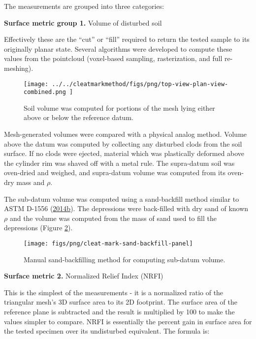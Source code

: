 \documentclass[
  letterpaper,
  openany]{book}
\begin{document}
The measurements are grouped into three categories:

\textbf{Surface metric group 1.} Volume of disturbed soil

Effectively these are the ``cut'' or ``fill'' required to return the tested sample to its originally planar state. Several algorithms were developed to compute these values from the pointcloud (voxel-based sampling, rasterization, and full re-meshing).

\begin{figure}

{\centering \texttt{[image: ../../cleatmarkmethod/figs/png/top-view-plan-view-combined.png  ]} 

}

\caption[3D mesh split by vertex elevations]{Soil volume was computed for portions of the mesh lying either above or below the reference datum.}\label{fig:volume-slicing-fig}
\end{figure}

Mesh-generated volumes were compared with a physical analog method.
Volume above the datum was computed by collecting any disturbed clods from the soil surface.
If no clods were ejected, material which was plastically deformed above the cylinder rim was shaved off with a metal rule.
The supra-datum soil was oven-dried and weighed, and supra-datum volume was computed from its oven-dry mass and \(\rho\).

The sub-datum volume was computed using a sand-backfill method similar to ASTM D-1556 (\protect\hyperlink{ref-ASTMD1556-07}{2014b}).
The depressions were back-filled with dry sand of known \(\rho\) and the volume was computed from the mass of sand used to fill the depressions (Figure \ref{fig:cleat-mark-sand-backfill-panel}).

\begin{figure}

{\centering \texttt{[image: figs/png/cleat-mark-sand-backfill-panel]} 

}

\caption[Sand backfill method for cleat-mark volume]{Manual sand-backfilling method for computing sub-datum volume.}\label{fig:cleat-mark-sand-backfill-panel}
\end{figure}

\textbf{Surface metric 2.} Normalized Relief Index (NRFI)

This is the simplest of the measurements - it is a normalized ratio of the triangular mesh's 3D surface area to its 2D footprint.
The surface area of the reference plane is subtracted and the result is multiplied by 100 to make the values simpler to compare.
NRFI is essentially the percent gain in surface area for the tested specimen over its undisturbed equivalent. The formula is:
\end{document}
